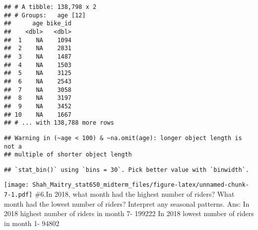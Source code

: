 \documentclass[]{article}
\newenvironment{Shaded}{\begin{snugshade}}{\end{snugshade}}
\newcommand{\DataTypeTok}[1]{\textcolor[rgb]{0.13,0.29,0.53}{#1}}
\newcommand{\DecValTok}[1]{\textcolor[rgb]{0.00,0.00,0.81}{#1}}
\newcommand{\KeywordTok}[1]{\textcolor[rgb]{0.13,0.29,0.53}{\textbf{#1}}}
\newcommand{\NormalTok}[1]{#1}
\newcommand{\OperatorTok}[1]{\textcolor[rgb]{0.81,0.36,0.00}{\textbf{#1}}}
\newcommand{\StringTok}[1]{\textcolor[rgb]{0.31,0.60,0.02}{#1}}
\begin{document}
\begin{verbatim}
## # A tibble: 138,798 x 2
## # Groups:   age [12]
##      age bike_id
##    <dbl>   <dbl>
##  1    NA    1094
##  2    NA    2831
##  3    NA    1487
##  4    NA    1503
##  5    NA    3125
##  6    NA    2543
##  7    NA    3058
##  8    NA    3197
##  9    NA    3452
## 10    NA    1667
## # ... with 138,788 more rows
\end{verbatim}

\begin{Shaded}
\end{Shaded}

\begin{verbatim}
## Warning in (~age < 100) & ~na.omit(age): longer object length is not a
## multiple of shorter object length
\end{verbatim}

\begin{verbatim}
## `stat_bin()` using `bins = 30`. Pick better value with `binwidth`.
\end{verbatim}

\texttt{[image: Shah\_Maitry\_stat650\_midterm\_files/figure-latex/unnamed-chunk-7-1.pdf]}
\newpage \#6.In 2018, what month had the highest number of riders? What
month had the lowest number of riders? Interpret any seasonal patterns.
Ans: In 2018 highest number of riders in month 7- 199222 In 2018 lowest
number of riders in month 1- 94802

\begin{Shaded}
\end{Shaded}
\end{document}
